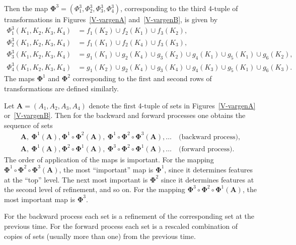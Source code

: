 \documentclass[a4paper]{amsart}
\theoremstyle{plain}
\theoremstyle{definition}
\theoremstyle{remark}
\begin{document}
Then the map $  \boldsymbol{\Phi}^3 =   (\Phi^3_1, \Phi^3_2, \Phi^3_3, \Phi^3_4 )$, corresponding to the third 4-tuple of transformations in Figures~\ref{V-vargenA} and~\ref{V-vargenB},  is given by
\begin{align*}
\Phi^3_1(K_1,K_2,K_3,K_4) &= f_1(K_2)\cup f_2(K_1) \cup f_3(K_2), \\
\Phi^3_2(K_1,K_2,K_3,K_4) &= f_1(K_1)\cup f_2(K_4) \cup f_3(K_3), \\
\Phi^3_3(K_1,K_2,K_3,K_4) &=g_1(K_1)\cup g_2(K_4) \cup g_3(K_2)\cup g_4(K_1)\cup g_5(K_1) \cup g_6(K_2), \\
\Phi^3_4(K_1,K_2,K_3,K_4) &= g_1(K_2)\cup g_2(K_4) \cup g_3(K_4)\cup g_4(K_3)\cup g_5(K_1) \cup g_6(K_3).
\end{align*} 
The maps $  \boldsymbol{\Phi}^1 $ and $  \boldsymbol{\Phi}^2 $ corresponding to the first and second rows of transformations are defined similarly.

Let $ \boldsymbol{A} = (A_1,A_2,A_3,A_4) $ denote the first 4-tuple of sets in Figures~\ref{V-vargenA} or~\ref{V-vargenB}.  Then for the backward and forward processes one obtains the sequence of sets
\begin{gather*}
\boldsymbol{A} , \  \boldsymbol{\Phi}^1(\boldsymbol{A} ),   \boldsymbol{\Phi}^1\circ  \boldsymbol{\Phi}^2(\boldsymbol{A} ),
    \    \boldsymbol{\Phi}^1 \circ \boldsymbol{\Phi}^2\circ  \boldsymbol{\Phi}^3(\boldsymbol{A} ), \dots
\quad \text{(backward process)}  ,      \\
\boldsymbol{A} , \  \boldsymbol{\Phi}^1(\boldsymbol{A} ),   \boldsymbol{\Phi}^2\circ  \boldsymbol{\Phi}^1(\boldsymbol{A} ),
    \    \boldsymbol{\Phi}^3 \circ \boldsymbol{\Phi}^2\circ  \boldsymbol{\Phi}^1(\boldsymbol{A} ), \dots 
    \quad \text{(forward process)} . 
    \end{gather*}    
The order of application of the maps is important.   For  the  mapping $  \boldsymbol{\Phi}^1 \circ \boldsymbol{\Phi}^2\circ  \boldsymbol{\Phi}^3(\boldsymbol{A} ) $, the most ``important'' map is $  \boldsymbol{\Phi}^1$,   since it determines features   at the ``top'' level.
The next most important is $  \boldsymbol{\Phi}^2 $ since it determines features at the second level of refinement, and so on.
For the  mapping $  \boldsymbol{\Phi}^3 \circ \boldsymbol{\Phi}^2\circ  \boldsymbol{\Phi}^1(\boldsymbol{A} ) $,  the most important map is  $  \boldsymbol{\Phi}^3$.

\medskip  For the backward process each set is a refinement of the corresponding set at the previous time.  For the forward process each set is a rescaled combination of copies of sets (usually more than one) from the previous time.
\end{document}
